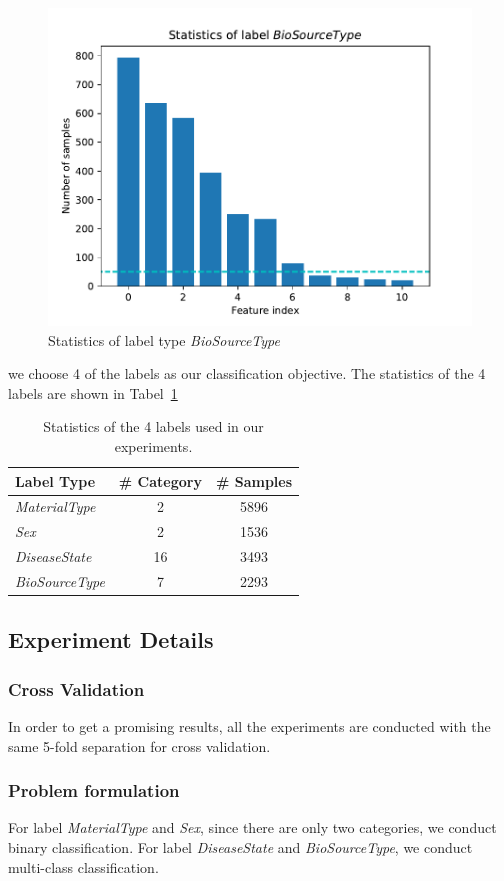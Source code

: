 \documentclass[sigconf]{acmart}
\begin{document}
	\begin{figure}[h]
	\centering
	\includegraphics[width=0.8\linewidth]{../figs/Stat_BioSourceType}
	\caption{Statistics of label type \textit{BioSourceType}}
	\label{fig:Stat_BioSourceType}
	\end{figure}
	
	
	we choose 4 of the labels as our classification objective. The statistics of the 4 labels are shown in Tabel~\ref{tab:label}
	\begin{table}[tbp]
		\centering
		\begin{tabular}{l|cc}
			\toprule
			{Label Type} & \# Category & \# Samples \\
			\midrule
			{\textit{MaterialType}}& 2 & 5896 \\
			{\textit{Sex}}		& 2 & 1536     \\
			{\textit{DiseaseState}}& 16 & 3493 \\
			{\textit{BioSourceType}}& 7 & 2293 \\
			\bottomrule	
		\end{tabular}
		\caption{ Statistics of the 4 labels used in our experiments. }
		\label{tab:label}
	\end{table}
	
	\subsection{Experiment Details}
	\subsubsection{Cross Validation}
	In order to get a promising results, all the experiments are conducted with the same 5-fold separation for cross validation.  
	
	\subsubsection{Problem formulation}
	For label \textit{MaterialType} and \textit{Sex}, since there are only two categories, we conduct binary classification. For label \textit{DiseaseState} and \textit{BioSourceType}, we conduct multi-class classification.
	
\end{document}
